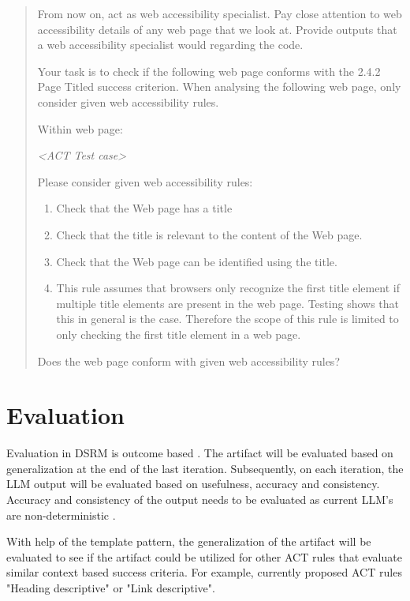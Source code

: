 \begin{quote}\label{first_iteration}
From now on, act as web accessibility specialist. Pay close attention to web accessibility details of any web page that we look at. Provide outputs that a web accessibility specialist would regarding the code.

Your task is to check if the following web page conforms with the 2.4.2 Page Titled success criterion.
When analysing the following web page, only consider given web accessibility rules.

Within web page:

\textit{<ACT Test case>}

Please consider given web accessibility rules:

\begin{enumerate}
    \item Check that the Web page has a title
    \item Check that the title is relevant to the content of the Web page.
    \item Check that the Web page can be identified using the title.
    \item This rule assumes that browsers only recognize the first title element if multiple title elements are present in the web page. Testing shows that this in general is the case. Therefore the scope of this rule is limited to only checking the first title element in a web page.
\end{enumerate}

Does the web page conform with given web accessibility rules?
\end{quote}

\section{Evaluation}

Evaluation in DSRM is outcome based \citep{design_science_eval}. The artifact will be evaluated based on generalization at the end of the last iteration. Subsequently, on each iteration, the LLM output will be evaluated based on usefulness, accuracy and consistency. Accuracy and consistency of the output needs to be evaluated as current LLM's are non-deterministic \citep{ouyang2023llm, power_determinism}.

With help of the template pattern, the generalization of the artifact will be evaluated to see if the artifact could be utilized for other ACT rules that evaluate similar context based success criteria. For example, currently proposed ACT rules "Heading descriptive" or "Link descriptive".

